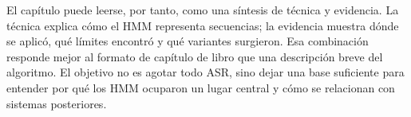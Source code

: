 El capítulo puede leerse, por tanto, como una síntesis de técnica y evidencia. La técnica explica cómo el HMM representa secuencias; la evidencia muestra dónde se aplicó, qué límites encontró y qué variantes surgieron. Esa combinación responde mejor al formato de capítulo de libro que una descripción breve del algoritmo. El objetivo no es agotar todo ASR, sino dejar una base suficiente para entender por qué los HMM ocuparon un lugar central y cómo se relacionan con sistemas posteriores.
